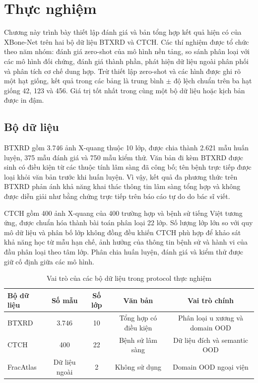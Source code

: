 \chapter{Thực nghiệm}
\label{chap:experiments_new}

Chương này trình bày thiết lập đánh giá và bản tổng hợp kết quả hiện có của XBone-Net trên hai bộ dữ liệu BTXRD và CTCH. Các thí nghiệm được tổ chức theo năm nhóm: đánh giá zero-shot của mô hình nền tảng, so sánh phân loại với các mô hình đối chứng, đánh giá thành phần, phát hiện dữ liệu ngoài phân phối và phân tích cơ chế dung hợp. Trừ thiết lập zero-shot và các hình được ghi rõ một hạt giống, kết quả trong các bảng là trung bình $\pm$ độ lệch chuẩn trên ba hạt giống 42, 123 và 456. Giá trị tốt nhất trong cùng một bộ dữ liệu hoặc kịch bản được in đậm.

\section{Bộ dữ liệu}

BTXRD gồm 3.746 ảnh X-quang thuộc 10 lớp, được chia thành 2.621 mẫu huấn luyện, 375 mẫu đánh giá và 750 mẫu kiểm thử. Văn bản đi kèm BTXRD được sinh có điều kiện từ các thuộc tính lâm sàng đã công bố; tên bệnh trực tiếp được loại khỏi văn bản trước khi huấn luyện. Vì vậy, kết quả đa phương thức trên BTXRD phản ánh khả năng khai thác thông tin lâm sàng tổng hợp và không được diễn giải như bằng chứng trực tiếp trên báo cáo tự do do bác sĩ viết.

CTCH gồm 400 ảnh X-quang của 400 trường hợp và bệnh sử tiếng Việt tương ứng, được chuẩn hóa thành bài toán phân loại 22 lớp. Số lượng lớp lớn so với quy mô dữ liệu và phân bố lớp không đồng đều khiến CTCH phù hợp để khảo sát khả năng học từ mẫu hạn chế, ảnh hưởng của thông tin bệnh sử và hành vi của đầu phân loại theo tâm lớp. Phân chia huấn luyện, đánh giá và kiểm thử được giữ cố định giữa các mô hình.

\begin{table}[H]
\centering
\small
\begin{tabular}{|l|c|c|c|c|}
\hline
\textbf{Bộ dữ liệu} & \textbf{Số mẫu} & \textbf{Số lớp} & \textbf{Văn bản} & \textbf{Vai trò chính} \\ \hline
BTXRD & 3.746 & 10 & Tổng hợp có điều kiện & Phân loại u xương và domain OOD \\ \hline
CTCH & 400 & 22 & Bệnh sử lâm sàng & Dữ liệu đích và semantic OOD \\ \hline
FracAtlas & Dữ liệu ngoài & 2 & Không sử dụng & Domain OOD ngoại viện \\ \hline
\end{tabular}
\caption{Vai trò của các bộ dữ liệu trong protocol thực nghiệm}
\label{tab:ch4draft_datasets}
\end{table}


